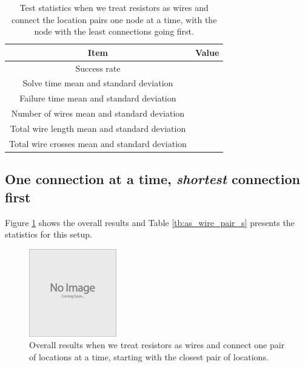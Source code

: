 \begin{table}[H]
\begin{center}
\begin{singlespace}
\begin{tabular}{| c | c |}
\hline
Item & Value \\
\hline\hline
Success rate & \\
Solve time mean and standard deviation & \\
Failure time mean and standard deviation & \\
Number of wires mean and standard deviation & \\
Total wire length mean and standard deviation & \\
Total wire crosses mean and standard deviation & \\
\hline
\end{tabular}
\end{singlespace}
\end{center}
\label{tb:as_wire_node_a}
\caption{Test statistics when we treat resistors as wires and connect the
location pairs one node at a time, with the node with the least connections
going first.}
\end{table}

\subsection{One connection at a time, \textit{shortest} connection first}

Figure \ref{fig:as_wire_pair_s}
shows the overall results and Table \ref{tb:as_wire_pair_s} presents the
statistics for this setup.

\begin{figure}[H]
\begin{center}
\includegraphics{Images/placeholder.jpg}
\caption{Overall results when we treat resistors as wires and connect one
pair of locations at a time, starting with the closest pair of locations.}
\label{fig:as_wire_pair_s}
\end{center}
\end{figure}

